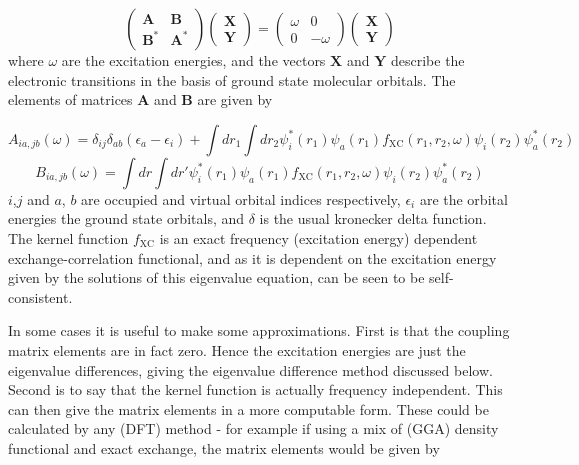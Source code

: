 \begin{equation}
\label{full_cassida_eq1}
\left(\begin{matrix}
\mathbf{A} & \mathbf{B} \\
\mathbf{B^*} & \mathbf{A^*}
\end{matrix}\right)
\left(\begin{matrix}
\mathbf{X}\\
\mathbf{Y}
\end{matrix}\right)
=
\left(\begin{matrix}
\omega & 0\\
0 & -\omega
\end{matrix}\right)
\left(\begin{matrix}
\mathbf{X}\\
\mathbf{Y}
\end{matrix}\right)
\end{equation}
%
where $\omega$ are the excitation energies, and the vectors $\mathbf{X}$ and $\mathbf{Y}$ 
describe the electronic transitions in the basis of ground state molecular orbitals. 
The elements of matrices $\mathbf{A}$ and $\mathbf{B}$ are given by

\begin{equation}
A_{ia,jb}\left(\omega\right) = \delta_{ij}\delta_{ab}\left(\epsilon_a - \epsilon_i\right) + \int dr_1 \int dr_2 \psi_i^*\left(r_1\right) \psi_a\left(r_1\right) f_{\text{XC}}\left(r_1, r_2, \omega\right) \psi_i\left(r_2\right) \psi_a^*\left(r_2\right)
\end{equation}
%
\begin{equation}
B_{ia,jb}\left(\omega\right) = \int dr \int dr' \psi_i^*\left(r_1\right) \psi_a\left(r_1\right) f_{\text{XC}}\left(r_1, r_2, \omega\right) \psi_i\left(r_2\right) \psi_a^*\left(r_2\right)
\end{equation}
%
$i$,$j$ and $a$, $b$ are occupied and virtual orbital indices respectively, $\epsilon_i$
are the orbital energies the ground state orbitals, and $\delta$ is the usual kronecker 
delta function. The kernel function $f_{\text{XC}}$ is an exact frequency (excitation energy) 
dependent exchange-correlation functional, and as it is dependent on the excitation 
energy given by the solutions of this eigenvalue equation, can be seen to be self-consistent.

In some cases it is useful to make some approximations. First is that the coupling 
matrix elements are in fact zero. Hence the excitation energies are just the eigenvalue differences, 
giving the eigenvalue difference method discussed below. Second is to say that the 
kernel function is actually frequency independent. This can then give the matrix 
elements in a more computable form. These could be calculated by any (DFT) method
- for example if using a mix of (GGA) density functional and exact exchange, the
matrix elements would be given by

